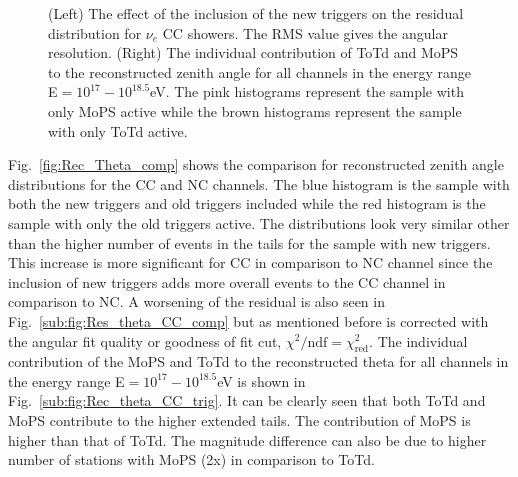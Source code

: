 \begin{figure}[h!]
  \centering
  \hfill
  \caption{(Left) The effect of the inclusion of the new triggers on the residual distribution for $\nu_e$ CC showers. The RMS value gives the angular resolution. (Right) The individual contribution of ToTd and MoPS to the reconstructed zenith angle for all channels in the energy range E$=10^{17}-10^{18.5}$eV. The pink histograms represent the sample with only MoPS active while the brown histograms represent the sample with only ToTd active.}
  \label{fig:Res_Theta_2}
\end{figure}

Fig.~\ref{fig:Rec_Theta_comp} shows the comparison for reconstructed zenith angle distributions for the CC and NC channels. The blue histogram is the sample with both the new triggers and old triggers included while the red histogram is the sample with only the old triggers active. The distributions look very similar other than the higher number of events in the tails for the sample with new triggers. This increase is more significant for CC in comparison to NC channel since the inclusion of new triggers adds more overall events to the CC channel in comparison to NC. A worsening of the residual is also seen in Fig.~\ref{sub:fig:Res_theta_CC_comp} but as mentioned before is corrected with the angular fit quality or goodness of fit cut, $\chi^2/{\text{ndf}} = \chi^2_{\text{red}}$. 
The individual contribution of the MoPS and ToTd to the reconstructed theta for all channels in the energy range E$=10^{17}-10^{18.5}$eV is shown in Fig.~\ref{sub:fig:Rec_theta_CC_trig}. It can be clearly seen that both ToTd and MoPS contribute to the higher extended tails. The contribution of MoPS is higher than that of ToTd. The magnitude difference can also be due to higher number of stations with MoPS (2x) in comparison to ToTd.

